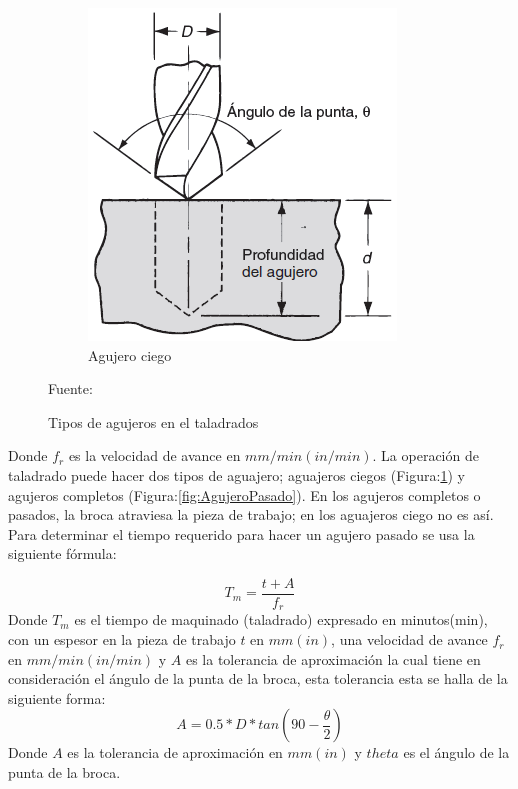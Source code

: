 \begin{figure}[hbt]
\begin{subfigure}{0.3\textwidth}
        \includegraphics[width=0.9\linewidth]{Cap1_FormulaciondelProyecto/Figuras/taladradociego.PNG}
        \caption{Agujero ciego}
        \label{fig:AgujeroCiego}
    \end{subfigure} 
    
    \caption{Tipos de agujeros en el taladrados}{Fuente: \citep{groover2007fundamentals}}
    \label{fig:TiposDeAngujeros}
\end{figure}

Donde $f_{r}$ es la velocidad de avance en $mm/min (in/min).$
La operación de taladrado puede hacer dos tipos de aguajero; aguajeros ciegos (Figura:\ref{fig:AgujeroCiego}) y agujeros completos (Figura:\ref{fig:AgujeroPasado}). En los agujeros completos o pasados, la broca atraviesa la pieza de trabajo; en los aguajeros ciego no es así.  Para determinar el tiempo requerido para hacer un agujero pasado se usa la siguiente fórmula\citep{groover2007fundamentals}:

\begin{equation}
    T_{m}=\frac{t+A}{f_{r}}
\end{equation}
Donde $T_{m}$ es el tiempo de maquinado (taladrado) expresado en minutos(min), con un espesor en la pieza de trabajo $t$ en $mm(in)$, una velocidad de avance $f_{r}$ en $mm/min(in/min)$ y $A$ es la tolerancia de aproximación la cual tiene en consideración el ángulo de la punta de la broca, esta tolerancia esta se halla de la siguiente forma\citep{groover2007fundamentals}:
\begin{equation}
A=0.5*D*tan(90-\frac{\theta}{2})    
\end{equation}
Donde $A$ es la tolerancia de aproximación en $mm(in)$ y $theta$ es el ángulo de la punta de la broca.   
    
